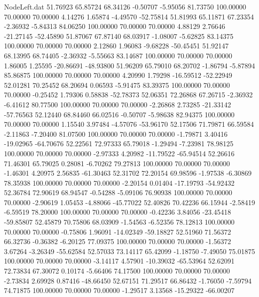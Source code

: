 \begin{filecontents}{NodeLeft.dat}
  51.76923   65.85724   68.34126    -0.50707   -5.95056   81.73750  100.00000   70.00000   70.00000    4.14276    1.65874   -4.49570  -52.75814
  51.81993   65.11871   67.23354    -2.36932   -5.84313   84.06250  100.00000   70.00000   70.00000    4.88129    2.76646  -21.27145  -52.45890
  51.87067   67.87140   68.03917    -1.08007   -5.62825   83.14375  100.00000   70.00000   70.00000    2.12860    1.96083   -9.68228  -50.45451
  51.92147   68.13995   68.74405    -2.36932   -5.55663   83.14687  100.00000   70.00000   70.00000    1.86005    1.25595  -20.86691  -48.93800
  51.96209   65.79010   68.20702    -1.86794   -5.87894   85.86875  100.00000   70.00000   70.00000    4.20990    1.79298  -16.59512  -52.22949
  52.01281   70.25452   68.20694     0.06593   -5.91475   83.39375  100.00000   70.00000   70.00000   -0.25452    1.79306    0.58838  -52.78373
  52.06351   72.26868   67.26715    -2.36932   -6.41612   80.77500  100.00000   70.00000   70.00000   -2.26868    2.73285  -21.33142  -57.76563
  52.12440   68.84460   66.02516    -0.50707   -5.98638   82.94375  100.00000   70.00000   70.00000    1.15540    3.97484   -4.57076  -53.96170
  52.17506   71.79871   66.59584    -2.11863   -7.20400   81.07500  100.00000   70.00000   70.00000   -1.79871    3.40416  -19.02965  -64.70676
  52.22561   72.97333   65.79018    -1.29494   -7.23981   78.98125  100.00000   70.00000   70.00000   -2.97333    4.20982  -11.79522  -65.94514
  52.26616   71.46301   65.79025     0.28081   -6.70262   79.27813  100.00000   70.00000   70.00000   -1.46301    4.20975    2.56835  -61.30463
  52.31702   72.20154   69.98596    -1.97538   -6.30869   78.35938  100.00000   70.00000   70.00000   -2.20154    0.01404  -17.19793  -54.92432
  52.36784   72.90619   68.94547    -0.54288   -5.09106   76.90938  100.00000   70.00000   70.00000   -2.90619    1.05453   -4.88066  -45.77022
  52.40826   70.42236   66.15944    -2.58419   -6.59519   78.20000  100.00000   70.00000   70.00000   -0.42236    3.84056  -23.45418  -59.85807
  52.45879   70.75806   68.03909    -1.54563   -6.52356   78.12813  100.00000   70.00000   70.00000   -0.75806    1.96091  -14.02349  -59.18827
  52.51960   71.56372   66.32736    -0.36382   -6.20125   77.09375  100.00000   70.00000   70.00000   -1.56372    3.67264   -3.26349  -55.62584
  52.57033   73.14117   65.42099    -1.18750   -7.49050   75.01875  100.00000   70.00000   70.00000   -3.14117    4.57901  -10.39032  -65.53964
  52.62091   72.73834   67.30072     0.10174   -5.66406   74.17500  100.00000   70.00000   70.00000   -2.73834    2.69928    0.87416  -48.66450
  52.67151   71.29517   66.86432    -1.76050   -7.59794   74.71875  100.00000   70.00000   70.00000   -1.29517    3.13568  -15.29322  -66.00207

\end{filecontents}
